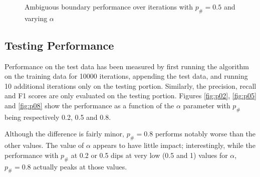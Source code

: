 \documentclass[11pt]{article}
\begin{document}
\begin{figure}[h!]

  \caption{Ambiguous boundary performance over iterations with $p_\# = 0.5$ and varying $\alpha$}
  \label{fig:iterations}
\end{figure}

\subsection{Testing Performance}
Performance on the test data has been measured by first running the algorithm on
the training data for 10000 iterations, appending the test data, and running 10
additional iterations only on the testing portion. Similarly, the precision, recall and F1
scores are only evaluated on the testing portion. Figures \ref{fig:p02},
\ref{fig:p05} and \ref{fig:p08} show the performance as a function of the $\alpha$
parameter with $p_\#$ being respectively 0.2, 0.5 and 0.8.

Although the difference is fairly minor, $p_\# = 0.8$ performs notably worse
than the other values. The value of $\alpha$ appears to have little impact;
interestingly, while the performance with $p_\#$ at 0.2 or 0.5 dips at very low
(0.5 and 1) values for $\alpha$, $p_\# = 0.8$ actually peaks at those values.
\end{document}
